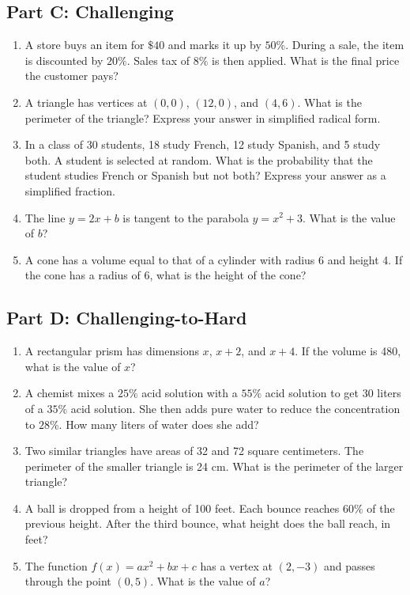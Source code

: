 \documentclass[14pt]{extarticle}
\begin{document}
\subsection*{Part C: Challenging}
\begin{enumerate}
  \item A store buys an item for \(\$40\) and marks it up by \(50\%\). During a sale, the item is discounted by \(20\%\). Sales tax of \(8\%\) is then applied. What is the final price the customer pays?
  \item A triangle has vertices at \((0, 0)\), \((12, 0)\), and \((4, 6)\). What is the perimeter of the triangle? Express your answer in simplified radical form.
  \item In a class of 30 students, 18 study French, 12 study Spanish, and 5 study both. A student is selected at random. What is the probability that the student studies French or Spanish but not both? Express your answer as a simplified fraction.
  \item The line \(y = 2x + b\) is tangent to the parabola \(y = x^2 + 3\). What is the value of \(b\)?
  \item A cone has a volume equal to that of a cylinder with radius 6 and height 4. If the cone has a radius of 6, what is the height of the cone?
\end{enumerate}

\subsection*{Part D: Challenging-to-Hard}
\begin{enumerate}
  \item A rectangular prism has dimensions \(x\), \(x + 2\), and \(x + 4\). If the volume is 480, what is the value of \(x\)?
  \item A chemist mixes a \(25\%\) acid solution with a \(55\%\) acid solution to get 30 liters of a \(35\%\) acid solution. She then adds pure water to reduce the concentration to \(28\%\). How many liters of water does she add?
  \item Two similar triangles have areas of 32 and 72 square centimeters. The perimeter of the smaller triangle is 24 cm. What is the perimeter of the larger triangle?
  \item A ball is dropped from a height of 100 feet. Each bounce reaches \(60\%\) of the previous height. After the third bounce, what height does the ball reach, in feet?
  \item The function \(f(x) = ax^2 + bx + c\) has a vertex at \((2, -3)\) and passes through the point \((0, 5)\). What is the value of \(a\)?
\end{enumerate}
\end{document}
